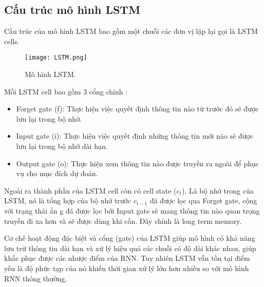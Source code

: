 \newpage
\subsection{Cấu trúc mô hình LSTM}
Cấu trúc của mô hình LSTM bao gồm một chuỗi các đơn vị lặp lại gọi là LSTM cells.

\begin{figure}[h!]
	\centering
	\texttt{[image: LSTM.png]}
	\caption{Mô hình LSTM.}
\end{figure} 

Mỗi LSTM cell bao gồm 3 cổng chính \cite{web:6}: 
\begin{itemize}
	\item Forget gate (f):
	Thực hiện việc quyết định thông tin nào từ trước đó sẽ được lưu lại trong bộ nhớ.
	\item Input gate (i):
	Thực hiện việc quyết định những thông tin mới nào sẽ được lưu lại trong bộ nhớ dài hạn.
	\item Output gate (o):
	Thực hiện xem thông tin nào được truyền ra ngoài để phục vụ cho mục đích dự đoán.
\end{itemize}

Ngoài ra thành phần của LSTM cell còn có cell state ($c_t$). Là bộ nhớ trong của LSTM, nó là tổng hợp của bộ nhớ trước $c_{t-1}$ đã được lọc qua Forget gate, cộng với trạng thái ẩn g đã được lọc bởi Input gate sẽ mang thông tin nào quan trọng truyền đi xa hơn và sẽ được dùng khi cần. Đây chính là long term memory.

Cơ chế hoạt động đặc biệt và cổng (gate) của LSTM giúp mô hình có khả năng lưu trữ thông tin dài hạn và xử lý hiệu quả các chuỗi có độ dài khác nhau, giúp khắc phục được các nhược điểm của RNN. Tuy nhiên LSTM vẫn tồn tại điểm yếu là độ phức tạp của nó khiến thời gian xử lý lớn hơn nhiều so với mô hình RNN thông thường.